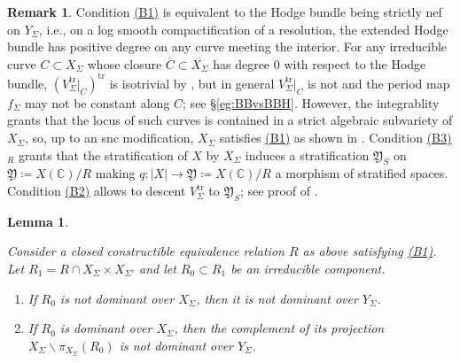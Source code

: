 \documentclass{amsart}
\newcommand{\customref}[2]{\hyperref[#1]{#2}}
\newcommand{\bs}{\backslash}
\newcommand{\ol}{\overline}
\newtheorem{lem}[theorem]{Lemma}
\theoremstyle{definition}
\newtheorem{remark}[theorem]{Remark}
\theoremstyle{remark}
\def\bC{\mathbb{C}}
\def\trans{\mathrm{tr}}
\renewcommand{\bar}[1]{\ol{#1}}
\def\fY{\mathfrak{Y}}
\numberwithin{equation}{section}
\begin{document}
\begin{remark} 
Condition \customref{b1}{(B1)} is equivalent to the Hodge bundle being strictly nef on $Y_\Sigma$, i.e., on a log smooth compactification of a resolution, the extended Hodge bundle has positive degree on any curve meeting the interior. For any irreducible curve $C\subset X_\Sigma$ whose closure $\bar C\subset\overline{X_\Sigma}$ has degree 0 with respect to the Hodge bundle,  $(V^{\trans}_{\Sigma}|_{C})^{\trans}$ is isotrivial by , but in general $V^{\trans}_{\Sigma}|_{C}$ is not and the period map $f_{\Sigma}$ may not be constant along $C$; see \S\ref{eg:BBvsBBH}. However, the integrablity grants that the locus of such curves is contained in a strict algebraic subvariety of $X_{\Sigma}$, so, up to an snc modification, $X_{\Sigma}$ satisfies \customref{b1}{(B1)} as shown in .
Condition \customref{b3}{(B3)}${}_{R}$ grants that the  stratification of $X$ by $X_{\Sigma}$ induces a stratification $\fY_{S}$ on $\fY\coloneqq  X(\bC)/R$ making $q \colon |X| \to \fY\coloneqq  X(\bC)/R$ a morphism of stratified spaces. Condition \customref{b2}{(B2)} allows to descent $V^{\trans}_{\Sigma}$ to $\fY_{S}$; see proof of . 
\end{remark}





\begin{lem}\label{lem:dominanceXYSigma}

Consider a closed constructible equivalence relation $R$ as above satisfying \customref{b1}{(B1)}. Let $R_1=R\cap X_{\Sigma}\times X_{\Sigma'}$ and let $R_0\subset R_1$ be an irreducible component. 

\begin{enumerate}

\item If $R_0$ is not dominant over $X_\Sigma$, then it is not dominant over $Y_\Sigma$.

\item If $R_0$ is dominant over $X_{\Sigma}$, then the complement of its projection $X_{\Sigma}\bs\pi_{X_{\Sigma}}(R_0)$ is not dominant over $Y_\Sigma$.

\end{enumerate}


\end{lem}
\end{document}
